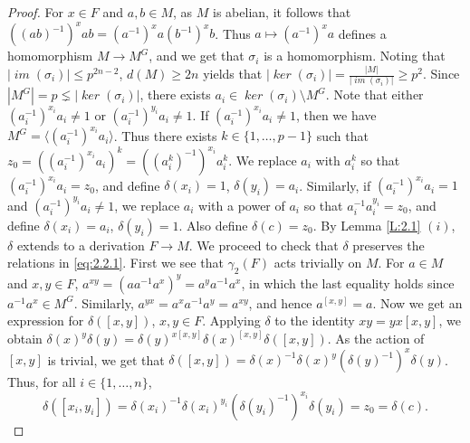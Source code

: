 \documentclass[preprint,sort&compress,12pt]{elsarticle}
\theoremstyle{definition}
\numberwithin{equation}{theorem}
\DeclareMathOperator{\Ker}{\mathit{ker}}
\DeclareMathOperator{\im}{\mathit{im}}
\begin{document}
\begin{proof}
\noindent For $x\in F$ and $a, b\in M$, as $M$ is abelian, it follows that $((ab)^{-1})^xab=(a^{-1})^xa(b^{-1})^xb$. Thus $a\mapsto (a^{-1})^xa$ defines a homomorphism $M\rightarrow M^G$, and we get that $\sigma_i$ is a homomorphism. Noting that $|\im(\sigma_i)|\le p^{2n-2}$, $d(M)\ge 2n$ yields that $|\Ker(\sigma_i)|= \frac{|M|}{|\im(\sigma_i)|}\ge p^2$. Since $|M^G|=p\lneq |\Ker(\sigma_i)|$, there exists $a_i\in \Ker(\sigma_i)\setminus M^G$. Note that either $(a_i^{-1})^{x_i}a_i\neq 1$ or $(a_i^{-1})^{y_i}a_i\neq 1$. If $(a_i^{-1})^{x_i}a_i\neq 1$, then we have $M^G=\langle (a_i^{-1})^{x_i}a_i\rangle$. Thus there exists $k\in \{1, \ldots, p-1\}$ such that $z_0=((a_i^{-1})^{x_i}a_i)^k= ((a_i^k)^{-1})^{x_i}a_i^k$. We replace $a_i$ with $a_i^k$ so that $(a_i^{-1})^{x_i}a_i=z_0$, and define $\delta(x_i)=1$, $\delta(y_i)=a_i$. Similarly, if $(a_i^{-1})^{x_i}a_i=1$ and $(a_i^{-1})^{y_i}a_i\neq 1$, we replace $a_i$ with a power of $a_i$ so that $a_i^{-1}a_i^{y_i}=z_0$, and define $\delta(x_i)= a_i$, $\delta(y_i)=1$. Also define $\delta(c)=z_0$. By Lemma \ref{L:2.1} $(i)$, $\delta$ extends to a derivation $F\rightarrow M$. We proceed to check that $\delta$ preserves the relations in \eqref{eq:2.2.1}. First we see that $\gamma_2(F)$ acts trivially on $M$. For $a\in M$ and $x, y\in F$, $a^{xy}=(aa^{-1}a^x)^y=a^ya^{-1}a^x$, in which the last equality holds since $a^{-1}a^x\in M^G$. Similarly, $a^{yx}=a^xa^{-1}a^y=a^{xy}$, and hence $a^{[x, y]}=a$. Now we get an expression for $\delta([x, y])$, $x, y\in F$. Applying $\delta$ to the identity $xy=yx[x, y]$, we obtain $\delta(x)^y\delta(y)=\delta(y)^{x[x, y]}\delta(x)^{[x, y]}\delta([x, y])$. As the action of $[x, y]$ is trivial, we get that $\delta([x, y])= \delta(x)^{-1}\delta(x)^y(\delta(y)^{-1})^x\delta(y)$. Thus, for all $i\in\{1,\ldots, n\}$,
\begin{equation*}
\delta([x_i, y_i])= \delta(x_i)^{-1}\delta(x_i)^{y_i} (\delta(y_i)^{-1})^{x_i}\delta(y_i) =z_0=\delta(c).
\end{equation*}


\end{proof}
\end{document}
